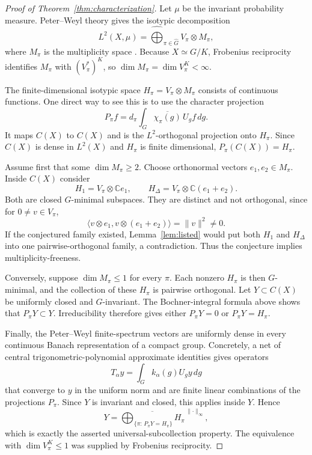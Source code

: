 \documentclass[11pt]{article}
\newcommand{\C}{\mathbb C}
\newcommand{\ip}[2]{\langle #1,#2\rangle}
\begin{document}
\begin{proof}[Proof of Theorem~\ref{thm:characterization}]
Let $\mu$ be the invariant probability measure.  Peter--Weyl theory gives
the isotypic decomposition
\[
 L^2(X,\mu)=\widehat\bigoplus_{\pi\in\widehat G}
             V_\pi\otimes M_\pi,
\]
where $M_\pi$ is the multiplicity space \cite{PeterWeyl,Folland}.  Because
$X\simeq G/K$, Frobenius reciprocity identifies
$M_\pi$ with $(V_\pi^*)^K$, so
$\dim M_\pi=\dim V_\pi^K<\infty$.

The finite-dimensional isotypic space
$H_\pi=V_\pi\otimes M_\pi$ consists of continuous functions.  One direct
way to see this is to use the character projection
\[
 P_\pi f=d_\pi\int_G \overline{\chi_\pi(g)}\,U_gf\,dg.
\]
It maps $C(X)$ to $C(X)$ and is the $L^2$-orthogonal projection onto
$H_\pi$.  Since $C(X)$ is dense in $L^2(X)$ and $H_\pi$ is finite
dimensional, $P_\pi(C(X))=H_\pi$.

Assume first that some $\dim M_\pi\geq2$.  Choose orthonormal vectors
$e_1,e_2\in M_\pi$.  Inside $C(X)$ consider
\[
 H_1=V_\pi\otimes\C e_1,
 \qquad
 H_\Delta=V_\pi\otimes\C(e_1+e_2).
\]
Both are closed $G$-minimal subspaces.  They are distinct and not
orthogonal, since for $0\neq v\in V_\pi$,
\[
 \ip{v\otimes e_1}{v\otimes(e_1+e_2)}=\lVert v\rVert^2\neq0.
\]
If the conjectured family existed, Lemma~\ref{lem:listed} would put both
$H_1$ and $H_\Delta$ into one pairwise-orthogonal family, a contradiction.
Thus the conjecture implies multiplicity-freeness.

Conversely, suppose $\dim M_\pi\leq1$ for every $\pi$.  Each nonzero
$H_\pi$ is then $G$-minimal, and the collection of these $H_\pi$ is pairwise
orthogonal.  Let $Y\subset C(X)$ be uniformly closed and $G$-invariant.
The Bochner-integral formula above shows that $P_\pi Y\subset Y$.
Irreducibility therefore gives either $P_\pi Y=0$ or $P_\pi Y=H_\pi$.

Finally, the Peter--Weyl finite-spectrum vectors are uniformly dense in every
continuous Banach representation of a compact group.  Concretely, a net of
central trigonometric-polynomial approximate identities gives operators
\[
 T_\alpha y=\int_G k_\alpha(g)U_gy\,dg
\]
that converge to $y$ in the uniform norm and are finite linear combinations
of the projections $P_\pi$.  Since $Y$ is invariant and closed, this applies
inside $Y$.  Hence
\[
 Y=\overline{\bigoplus_{\{\pi:\,P_\pi Y=H_\pi\}}H_\pi}^{\,\lVert\cdot\rVert_\infty},
\]
which is exactly the asserted universal-subcollection property.
The equivalence with $\dim V_\pi^K\leq1$ was supplied by Frobenius
reciprocity.
\end{proof}
\end{document}
